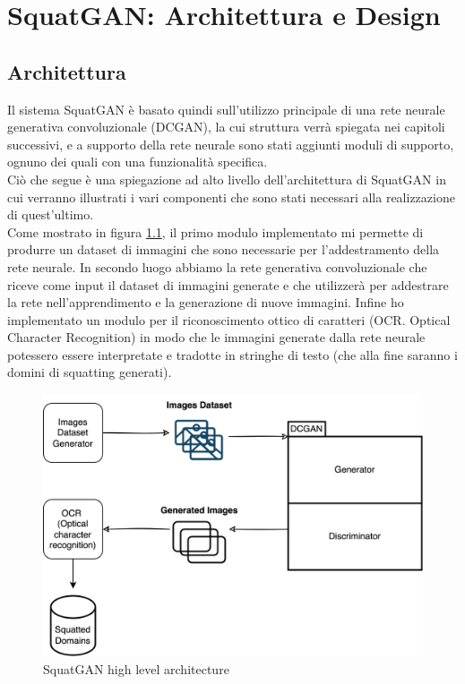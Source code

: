 \chapter{SquatGAN: Architettura e Design}

\section{Architettura}
Il sistema SquatGAN è basato quindi sull'utilizzo principale di una rete neurale generativa convoluzionale (DCGAN), la cui struttura verrà spiegata nei capitoli successivi, e a supporto della rete neurale sono stati aggiunti moduli di supporto, ognuno dei quali con una funzionalità specifica.\\
Ciò che segue è una spiegazione ad alto livello dell'architettura di SquatGAN in cui verranno illustrati i vari componenti che sono stati necessari alla realizzazione di quest'ultimo.\\
Come mostrato in figura \ref{fig:arch1}, il primo modulo implementato mi permette di produrre un dataset di immagini che sono necessarie per l'addestramento della rete neurale. In secondo luogo abbiamo la rete generativa convoluzionale che riceve come input il dataset di immagini generate e che utilizzerà per addestrare la rete nell'apprendimento e la generazione di nuove immagini. Infine ho implementato un modulo per il riconoscimento ottico di caratteri (OCR. Optical Character Recognition) in modo che le immagini generate dalla rete neurale potessero essere interpretate e tradotte in stringhe di testo (che alla fine saranno i domini di squatting generati).
\begin{figure}[!h]
  \centering
  \begin{minipage}[b]{0.6\textwidth}
    \includegraphics[width=\textwidth]{pictures/arch.png}
    \caption{SquatGAN high level architecture}
    \label{fig:arch1}
  \end{minipage}
  \hfill
\end{figure}

